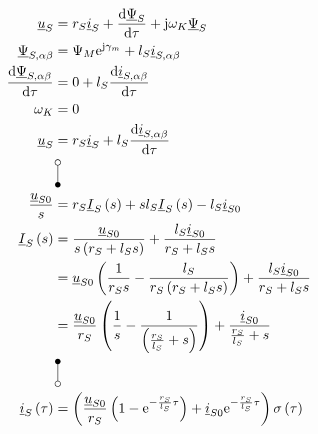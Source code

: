 \documentclass[11pt,a4paper]{scrartcl}
\newcommand{\mybr}[1]{\left(#1\right)}
\renewcommand{\j}{\mathrm{j}}
\renewcommand{\u}{\underline{u}}
\newcommand{\I}{\underline{I}}
\renewcommand{\i}{\underline{i}}
\newcommand{\PPsi}{\underline{\Psi}}
\newcommand{\0}{_{\mybr{0}}}
\newcommand{\1}{_{\mybr{1}}}
\newcommand{\2}{_{\mybr{2}}}
\renewcommand{\e}{\mathrm{e}}
\renewcommand{\d}{\mathrm{d}}
\newcommand{\isab}{\i_{S,\alpha\beta}}
\newcommand{\psab}{\PPsi_{S,\alpha\beta}}
\begin{document}
\section{}
\begin{align}
	\u_S&=r_S\i_S+\frac{\d\PPsi_S}{\d\tau}+\j\omega_K\PPsi_S\\
	\psab&=\Psi_M\e^{\j\gamma_m}+l_S\isab\\
	\frac{\d\psab}{\d\tau}&=0+l_S\frac{\d\isab}{\d\tau}\\
	\omega_K&=0\\
	\u_S&=r_S\i_S+l_S\frac{\d\isab}{\d\tau}\\
	&\rotatebox[origin=c]{270}{\laplace}\nonumber\\
	\frac{\u_{S0}}{s}&=r_S\I_S\mybr{s}+s l_S\I_S\mybr{s}-l_S \i_{S0}\\
	\I_S\mybr{s}&=\frac{\u_{S0}}{s\mybr{r_S+l_S s}}+\frac{l_S \i_{S0}}{r_S+l_S s}\\
	&=\u_{S0}\mybr{\frac{1}{r_S s}-\frac{l_S}{r_S\mybr{r_S+l_S s}}}+\frac{l_S \i_{S0}}{r_S+l_S s}\\
	&=\frac{\u_{S0}}{r_S}\mybr{\frac{1}{s}-\frac{1}{\mybr{\frac{r_S}{l_S}+ s}}}+\frac{\i_{S0}}{\frac{r_S}{l_S}+ s}\\
	&\rotatebox[origin=c]{270}{\Laplace}\nonumber\\
	\i_S\mybr{\tau}&=\mybr{\frac{\u_{S0}}{r_S}\mybr{1-\e^{-\frac{r_S}{l_S}\tau}}+\i_{S0}\e^{-\frac{r_S}{l_S}\tau}}\sigma\mybr{\tau}
\end{align}
\end{document}
